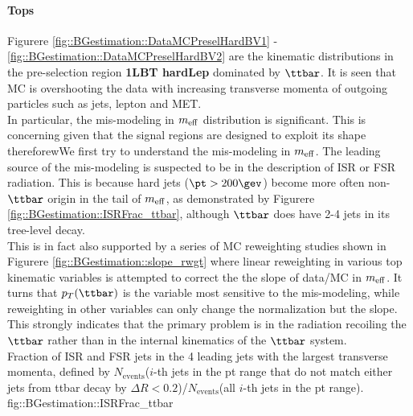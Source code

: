 \paragraph{Tops}
Figurere \ref{fig::BGestimation::DataMCPreselHardBV1} - \ref{fig::BGestimation::DataMCPreselHardBV2} are the kinematic distributions in the pre-selection region \textbf{1LBT hardLep} dominated by $\ttbar$.
It is seen that MC is overshooting the data with increasing transverse momenta of outgoing particles such as jets, lepton and MET. \\

In particular, the mis-modeling in $m_{\mathrm{eff}}$ distribution is significant. This is concerning given that the signal regions are designed to exploit its shape thereforewWe first try to understand the mis-modeling in $m_{\mathrm{eff}}$. The leading source of the mis-modeling is suspected to be in the description of ISR or FSR radiation. This is because hard jets ($\pt>200 \gev$) become more often non-$\ttbar$ origin in the tail of $m_{\mathrm{eff}}$, as demonstrated by Figurere \ref{fig::BGestimation::ISRFrac_ttbar}, although $\ttbar$ does have 2-4 jets in its tree-level decay. \\
This is in fact also supported by a series of MC reweighting studies shown in Figurere \ref{fig::BGestimation::slope_rwgt}  where linear reweighting in various top kinematic variables is attempted to correct the the slope of data/MC in $m_{\mathrm{eff}}$. It turns that $p_{T}(\ttbar)$ is the variable most sensitive to the mis-modeling, while reweighting in other variables can only change the normalization but the slope. This strongly indicates that the primary problem is in the radiation recoiling the $\ttbar$ rather than in the internal kinematics of the $\ttbar$ system. \\


{Fraction of ISR and FSR jets in the 4 leading jets with the largest transverse momenta, defined by $N_{\mathrm{events}}$($i$-th jets in the pt range that do not match either jets from ttbar decay by $\Delta R<0.2$)/$N_{\mathrm{events}}$(all $i$-th jets in the pt range).}
{fig::BGestimation::ISRFrac_ttbar}

